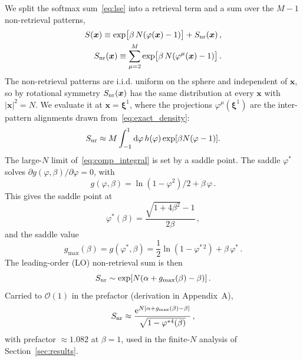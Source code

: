 \documentclass[letterpaper]{article} %
\newcommand{\bxi}{\boldsymbol{\xi}}
\newcommand{\bx}{\bm{x}}
\newcommand{\e}{{\mathrm{e}}}
\newcommand{\dd}{{\mathrm{d}}}
\newcommand{\Bnet}{\beta}
\newcommand{\p}{\partial}
\begin{document}
We split the softmax sum~\eqref{eq:lse} into a retrieval term and a sum over the $M-1$ non-retrieval patterns,
\begin{align}
S(\bx) \equiv \exp\!\big[\Bnet\,N (\varphi(\bx) - 1)\big] + S_{\rm nr}(\bx)\,,
\label{eq:softmax_sum}\\
S_{\rm nr}(\bx) \equiv \sum_{\mu=2}^{M} \exp\!\big[\Bnet\,N (\varphi^\mu(\bx) - 1)\big]\,.
\label{eq:comp_sum}
\end{align}
The non-retrieval patterns are i.i.d. uniform on the sphere and independent of $\bm x$, so by rotational symmetry $S_{\rm nr}(\bm x)$ has the same distribution at every $\bm x$ with $|\bm x|^2 = N$. We evaluate it at $\bm x = \bxi^1$, where the projections $\varphi^\mu(\bxi^1)$ are the inter-pattern alignments drawn from~\eqref{eq:exact_density}:
\begin{equation}
    S_{\rm nr} \approx M \int_{-1}^{1} \dd\varphi\, h(\varphi) \exp[\Bnet N(\varphi - 1)].
    \label{eq:comp_integral}
\end{equation}
The large-$N$ limit of~\eqref{eq:comp_integral} is set by a saddle point. The
saddle $\varphi^*$ solves $\p g(\varphi, \Bnet)/\p\varphi = 0$, with
\begin{equation}
    g(\varphi, \Bnet) = \ln(1-\varphi^2)/2 + \Bnet\,\varphi\,.
\end{equation}
This gives the saddle point at
\begin{equation}
\varphi^*(\Bnet) = \frac{\sqrt{1+4\Bnet^2} - 1}{2\Bnet}\,,
\label{eq:saddle}
\end{equation}
and the saddle value
\begin{equation}
g_{\max}(\Bnet) = g(\varphi^*, \Bnet) = \frac12 \ln(1 - \varphi^{*\,2}) + \Bnet\,\varphi^*\,.
\label{eq:saddle_value}
\end{equation}
The leading-order (LO) non-retrieval sum is then
\begin{equation}
    S_{\rm nr} \sim \exp[N(\alpha + g_{\max}(\Bnet) - \Bnet)]\,.
    \label{eq:comp_saddle}
\end{equation}
Carried to $\mathcal{O}(1)$ in the prefactor (derivation in Appendix~A),
\begin{equation}
    S_{\rm nr} \approx \frac{\e^{N[\alpha + g_{\max}(\Bnet) - \Bnet]}}{\sqrt{1-\varphi^{*4}(\Bnet)}}\,,
    \label{eq:comp_laplace}
\end{equation}
with prefactor $\approx 1.082$ at $\Bnet = 1$, used in the finite-$N$ analysis of Section~\ref{sec:results}.
\end{document}
